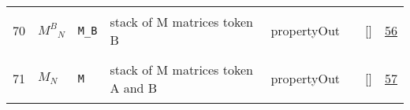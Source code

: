 \begin{longtable}{|p{1cm}|p{3cm}|p{3cm}|p{7cm}|p{3.0cm}|p{3cm}|p{2cm}|p{1cm}|}
    70
             & \hypertarget{"v:70"}{ $ {{M^{B}}}{_{N}} $}
             & \verb|M_B|
             & stack of M matrices token B
             & \begin{lay}propertyOut \end{lay}
             & $  $
             & []
             & \hyperlink{"e:56"}{ 56 }
                 \\
    71
             & \hypertarget{"v:71"}{ $ {M}{_{N}} $}
             & \verb|M|
             & stack of M matrices token A and B
             & \begin{lay}propertyOut \end{lay}
             & $  $
             & []
             & \hyperlink{"e:57"}{ 57 }
                 \\
    \end{longtable}